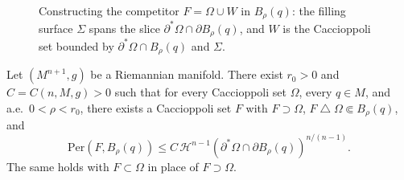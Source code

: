 \begin{figure}[ht]
\caption{Constructing the competitor $F = \Omega \cup W$ in $B_\rho(q)$: the filling surface $\Sigma$ spans the slice $\partial^*\Omega \cap \partial B_\rho(q)$, and $W$ is the Caccioppoli set bounded by $\partial^*\Omega \cap B_\rho(q)$ and $\Sigma$.}
\label{fig:caccioppoli-competitor}
\end{figure}

\begin{proposition}\label{prop:caccioppoli-competitor}
Let $(M^{n+1}, g)$ be a Riemannian manifold. There exist $r_0 > 0$ and $C = C(n, M, g) > 0$ such that for every Caccioppoli set $\Omega$, every $q \in M$, and a.e.\ $0 < \rho < r_0$, there exists a Caccioppoli set $F$ with $F \supset \Omega$, $F \mathbin{\triangle} \Omega \Subset B_\rho(q)$, and
\begin{equation}\label{eq:caccioppoli-competitor}
    \mathrm{Per}(F, B_\rho(q)) \leq C\,\mathcal{H}^{n-1}(\partial^*\Omega \cap \partial B_\rho(q))^{n/(n-1)}.
\end{equation}
The same holds with $F \subset \Omega$ in place of $F \supset \Omega$.
\end{proposition}

